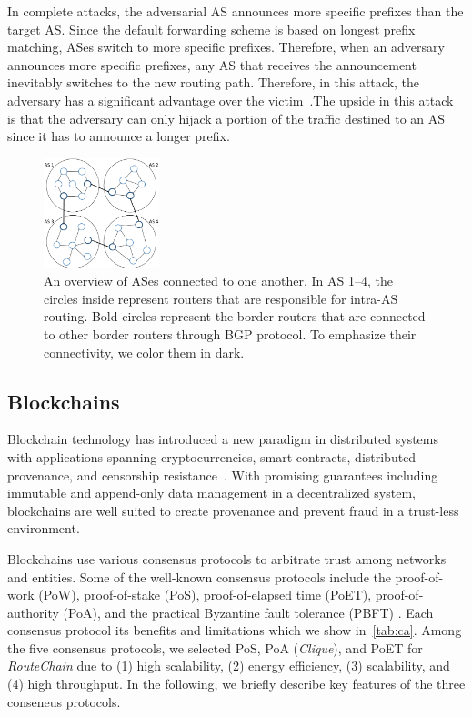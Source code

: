 \documentclass[5p]{elsarticle}
\newcommand{\rc}{{{\em RouteChain}}\xspace}
\begin{document}
In complete attacks, the adversarial AS announces more specific prefixes than the target AS. Since the default forwarding scheme is based on longest prefix matching, ASes switch to more specific prefixes. Therefore, when an adversary announces more specific prefixes, any AS that receives the announcement inevitably switches to the new routing path. Therefore, in this attack, the adversary has a significant advantage over the victim~\cite{BGPHijack}.The upside in this attack is that the adversary can only hijack a portion of the traffic destined to an AS since it has to announce a longer prefix.

\begin{figure}[t]
\begin{center}
\includegraphics[width=0.30\textwidth]{fig/ASes.pdf}
\caption{An overview of ASes connected to one another. In AS 1--4, the circles inside represent routers that are responsible for intra-AS routing. Bold circles represent the border routers that are connected to other border routers through BGP protocol. To emphasize their connectivity, we color them in dark.  } 
\label{fig:ASes}
\end{center}

\end{figure}


\subsection{Blockchains} \label{sec:BC}
Blockchain technology has introduced a new paradigm in distributed systems with applications spanning cryptocurrencies, smart contracts, distributed provenance, and censorship resistance~\cite{NeisseSN17,Omohundro14,GovernatoriIMRS18,AhmadSBM18}. With promising guarantees including immutable and append-only data management in a decentralized system, blockchains are well suited to create provenance and prevent fraud in a trust-less environment. 

Blockchains use various consensus protocols to arbitrate trust among networks and entities. Some of the well-known consensus protocols include the proof-of-work (PoW), proof-of-stake (PoS), proof-of-elapsed time (PoET), proof-of-authority (PoA), and the practical Byzantine fault tolerance (PBFT) \cite{SaadM18,SaadNKM18}. Each consensus protocol its benefits and limitations which we show in~\autoref{tab:ca}. Among the five consensus protocols, we selected PoS, PoA ({\em Clique}), and PoET for \rc due to (1) high scalability, (2) energy efficiency, (3) scalability, and (4) high throughput.  In the following, we briefly describe key features of the three conseneus protocols.  
\end{document}
